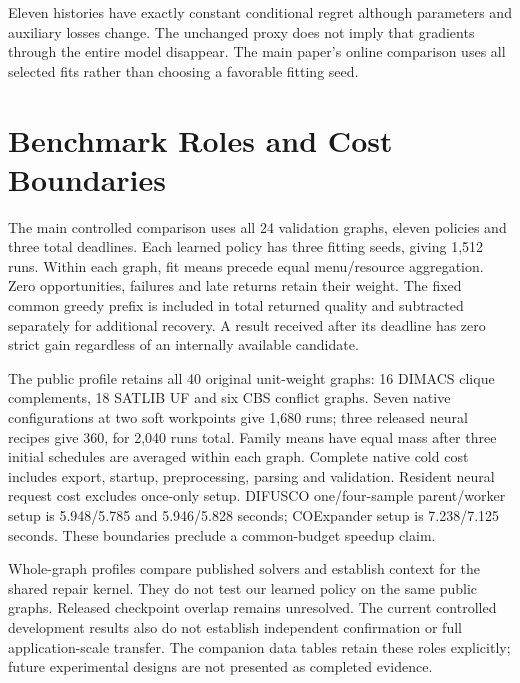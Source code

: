 Eleven histories have exactly constant conditional regret although parameters
and auxiliary losses change. The unchanged proxy does not imply that gradients
through the entire model disappear. The main paper's online comparison uses
all selected fits rather than choosing a favorable fitting seed.

\section{Benchmark Roles and Cost Boundaries}
The main controlled comparison uses all 24 validation graphs, eleven policies
and three total deadlines. Each learned policy has three fitting seeds,
giving 1,512 runs. Within each graph, fit means precede equal menu/resource
aggregation. Zero opportunities, failures and late returns retain their weight.
The fixed common greedy prefix is included in total returned quality and
subtracted separately for additional recovery. A result received after its
deadline has zero strict gain regardless of an internally available candidate.

The public profile retains all 40 original unit-weight graphs: 16 DIMACS clique
complements, 18 SATLIB UF and six CBS conflict graphs. Seven native
configurations at two soft workpoints give 1,680 runs; three released neural
recipes give 360, for 2,040 runs total. Family means have equal mass after
three initial schedules are averaged within each graph. Complete native cold
cost includes export, startup, preprocessing, parsing and validation. Resident
neural request cost excludes once-only setup. DIFUSCO one/four-sample
parent/worker setup is 5.948/5.785 and 5.946/5.828 seconds; COExpander setup
is 7.238/7.125 seconds. These boundaries preclude a common-budget speedup claim.

Whole-graph profiles compare published solvers and establish context for the
shared repair kernel. They do not test our learned policy on the same public
graphs. Released checkpoint overlap remains unresolved. The current controlled
development results also do not establish independent confirmation or full
application-scale transfer. The companion data tables retain these roles
explicitly; future experimental designs are not presented as completed evidence.

